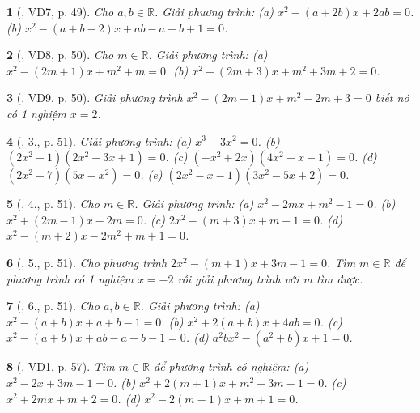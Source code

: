 \documentclass{article}
\newtheorem{baitoan}{}
\begin{document}
\begin{baitoan}[\cite{Thu_Viet_Minh_ptb2}, VD7, p. 49]
	Cho $a,b\in\mathbb{R}$. Giải phương trình: (a) $x^2 - (a + 2b)x + 2ab = 0$. (b) $x^2 - (a + b - 2)x + ab - a - b + 1 = 0$.
\end{baitoan}

\begin{baitoan}[\cite{Thu_Viet_Minh_ptb2}, VD8, p. 50]
	Cho $m\in\mathbb{R}$. Giải phương trình: (a) $x^2 - (2m + 1)x + m^2 + m = 0$. (b) $x^2 - (2m + 3)x + m^2 + 3m + 2 = 0$.
\end{baitoan}

\begin{baitoan}[\cite{Thu_Viet_Minh_ptb2}, VD9, p. 50]
	Giải phương trình $x^2 - (2m + 1)x + m^2 - 2m + 3 = 0$ biết nó có 1 nghiệm $x = 2$.
\end{baitoan}

\begin{baitoan}[\cite{Thu_Viet_Minh_ptb2}, 3., p. 51]
	Giải phương trình: (a) $x^3 - 3x^2 = 0$. (b) $(2x^2 - 1)(2x^2 - 3x + 1) = 0$. (c) $(-x^2 + 2x)(4x^2 - x - 1) = 0$. (d) $(2x^2 - 7)(5x - x^2) = 0$. (e) $(2x^2 - x - 1)(3x^2 - 5x + 2) = 0$.
\end{baitoan}

\begin{baitoan}[\cite{Thu_Viet_Minh_ptb2}, 4., p. 51]
	Cho $m\in\mathbb{R}$. Giải phương trình: (a) $x^2 - 2mx + m^2 - 1 = 0$. (b) $x^2 + (2m - 1)x - 2m = 0$. (c) $2x^2 - (m + 3)x + m + 1 = 0$. (d) $x^2 - (m + 2)x - 2m^2 + m + 1 = 0$.
\end{baitoan}

\begin{baitoan}[\cite{Thu_Viet_Minh_ptb2}, 5., p. 51]
	Cho phương trình $2x^2 - (m + 1)x + 3m - 1 = 0$. Tìm $m\in\mathbb{R}$ để phương trình có 1 nghiệm $x = -2$ rồi giải phương trình với m tìm được.
\end{baitoan}

\begin{baitoan}[\cite{Thu_Viet_Minh_ptb2}, 6., p. 51]
	Cho $a,b\in\mathbb{R}$. Giải phương trình: (a) $x^2 - (a + b)x + a + b - 1 = 0$. (b) $x^2 + 2(a + b)x + 4ab = 0$. (c) $x^2 - (a + b)x + ab - a + b - 1 = 0$. (d) $a^2bx^2 - (a^2 + b)x + 1 = 0$.
\end{baitoan}

\begin{baitoan}[\cite{Thu_Viet_Minh_ptb2}, VD1, p. 57]
	Tìm $m\in\mathbb{R}$ để phương trình có nghiệm: (a) $x^2 - 2x + 3m - 1 = 0$. (b) $x^2 + 2(m + 1)x + m^2 - 3m - 1 = 0$. (c) $x^2 + 2mx + m + 2 = 0$. (d) $x^2 - 2(m - 1)x + m + 1 = 0$.
\end{baitoan}
\end{document}
